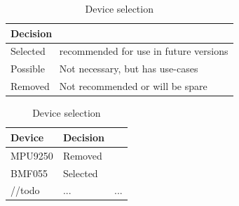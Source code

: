\begin{table}
\centering
\caption{Device selection}
\label{deviceSelectionTable}
\begin{tabular}{|l|l|}
	\hline
	\multicolumn{2}{|l|}{Decision} \\ \hline
	Selected & recommended for use in future versions \\ \hline
	Possible & Not necessary, but has use-cases \\ \hline
	Removed & Not recommended or will be spare \\ \hline
\end{tabular}
\begin{tabular}{|l|l|l|}
	\hline
	Device & Decision \\ \hline
	MPU9250 & Removed \\ \hline
	BMF055 & Selected \\ \hline
	//todo & ... & ... \\ \hline
\end{tabular}
\end{table}

